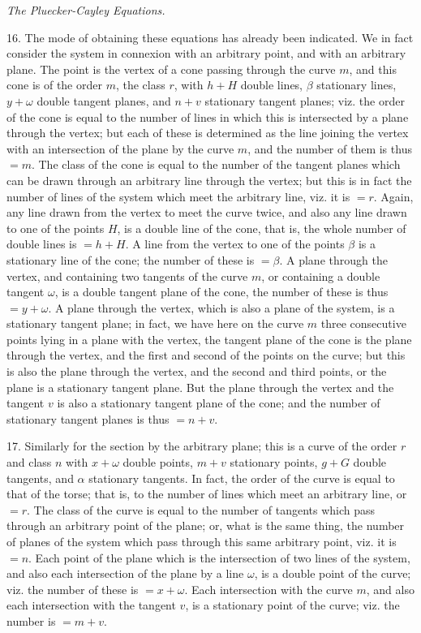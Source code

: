 \documentclass[11pt,a4paper]{article}
\begin{document}
\begin{center}\textit{The Pluecker-Cayley Equations.}\end{center}

16. The mode of obtaining these equations has already been indicated. We in fact
consider the system in connexion with an arbitrary point, and with an arbitrary plane.
The point is the vertex of a cone passing through the curve \(m\), and this cone is of
the order \(m\), the class \(r\), with \(h+H\) double lines, \(\beta\) stationary lines,
\(y+\omega\) double tangent planes, and \(n+v\) stationary tangent planes; viz. the
order of the cone is equal to the number of lines in which this is intersected by a
plane through the vertex; but each of these is determined as the line joining the
vertex with an intersection of the plane by the curve \(m\), and the number of them
is thus \(=m\). The class of the cone is equal to the number of the tangent planes
which can be drawn through an arbitrary line through the vertex; but this is in fact
the number of lines of the system which meet the arbitrary line, viz. it is \(=r\).
Again, any line drawn from the vertex to meet the curve twice, and also any line
drawn to one of the points \(H\), is a double line of the cone, that is, the whole
number of double lines is \(=h+H\). A line from the vertex to one of the points
\(\beta\) is a stationary line of the cone; the number of these is \(=\beta\). A plane
through the vertex, and containing two tangents of the curve \(m\), or containing a
double tangent \(\omega\), is a double tangent plane of the cone, the number of these
is thus \(=y+\omega\). A plane through the vertex, which is also a plane of the
system, is a stationary tangent plane; in fact, we have here on the curve \(m\) three
consecutive points lying in a plane with the vertex, the tangent plane of the cone is
the plane through the vertex, and the first and second of the points on the curve;
but this is also the plane through the vertex, and the second and third points, or
the plane is a stationary tangent plane. But the plane through the vertex and the
tangent \(v\) is also a stationary tangent plane of the cone; and the number of
stationary tangent planes is thus \(=n+v\).

17. Similarly for the section by the arbitrary plane; this is a curve of the order
\(r\) and class \(n\) with \(x+\omega\) double points, \(m+v\) stationary points,
\(g+G\) double tangents, and \(\alpha\) stationary tangents. In fact, the order of the
curve is equal to that of the torse; that is, to the number of lines which meet an
arbitrary line, or \(=r\). The class of the curve is equal to the number of tangents
which pass through an arbitrary point of the plane; or, what is the same thing, the
number of planes of the system which pass through this same arbitrary point, viz. it
is \(=n\). Each point of the plane which is the intersection of two lines of the system,
and also each intersection of the plane by a line \(\omega\), is a double point of the
curve; viz. the number of these is \(=x+\omega\). Each intersection with the curve
\(m\), and also each intersection with the tangent \(v\), is a stationary point of the
curve; viz. the number is \(=m+v\).
\end{document}
